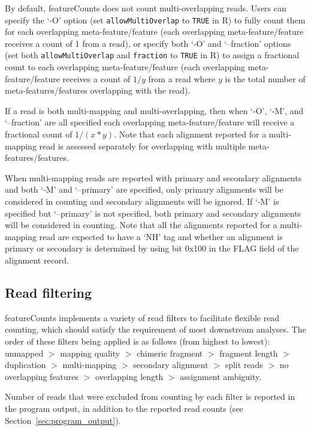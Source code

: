 \documentclass[12pt]{report}
\newcommand{\code}[1]{{\small\texttt{#1}}}
\newcommand{\featureCounts}{\textsf{featureCounts}}
\newcommand{\R}{\textsf{R}}
\begin{document}
By default, {\featureCounts} does not count multi-overlapping reads.
Users can specify the `-O' option (set \code{allowMultiOverlap} to \code{TRUE} in \R) to fully count them for each overlapping meta-feature/feature (each overlapping meta-feature/feature receives a count of 1 from a read), or specify both `-O' and `--fraction' options (set both \code{allowMultiOverlap} and \code{fraction} to \code{TRUE} in \R) to assign a fractional count to each overlapping meta-feature/feature (each overlapping meta-feature/feature receives a count of $1/y$ from a read where $y$ is the total number of meta-features/features overlapping with the read).

If a read is both multi-mapping and multi-overlapping, then when `-O', `-M', and `--fraction' are all specified each overlapping meta-feature/feature will receive a fractional count of $1/(x*y)$.
Note that each alignment reported for a multi-mapping read is assessed separately for overlapping with multiple meta-features/features.

When multi-mapping reads are reported with primary and secondary alignments and both `-M' and `--primary' are specified, only primary alignments will be considered in counting and secondary alignments will be ignored.
If `-M' is specified but `--primary' is not specified, both primary and secondary alignments will be considered in counting.
Note that all the alignments reported for a multi-mapping read are expected to have a `NH' tag and whether an alignment is primary or secondary is determined by using bit {0x100} in the FLAG field of the alignment record.


\subsection{Read filtering}
\label{sec:read_filtering}

{\featureCounts} implements a variety of read filters to facilitate flexible read counting, which should satisfy the requirement of most downstream analyses.
The order of these filters being applied is as follows (from highest to lowest):
unmapped
$>$ mapping quality
$>$ chimeric fragment
$>$ fragment length 
$>$ duplication
$>$ multi-mapping
$>$ secondary alignment
$>$ split reads
$>$ no overlapping features
$>$ overlapping length
$>$ assignment ambiguity.

Number of reads that were excluded from counting by each filter is reported in the program output, in addition to the reported read counts (see Section~\ref{sec:program_output}). 
\end{document}
